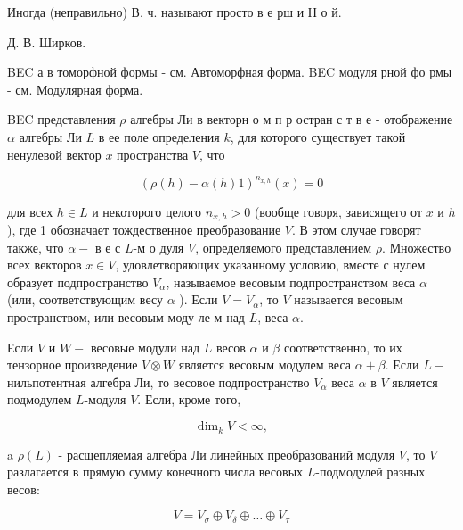 \documentclass[10pt]{article}
\begin{document}
Иногда (неправильно) В. ч. называют просто в е рш и Н о й.



Д. В. Ширков.



BEC а в томорфной формы - см. Автоморфная форма. BEC модуля рной фо рмы - см. Модулярная форма.



BEC представления $\rho$ алгебры Ли в векторн о м п р остран с т в е - отображение $\alpha$ алгебры Ли $L$ в ее поле определения $k$, для которого существует такой ненулевой вектор $x$ пространства $V$, что



\[

(\rho(h)-\alpha(h) 1)^{n_{x, h}}(x)=0

\]



для всех $h \in L$ и некоторого целого $n_{x, h}>0$ (вообще говоря, зависящего от $x$ и $h$ ), где 1 обозначает тождественное преобразование $V$. В этом случае говорят также, что $\alpha-$ в е с $L$-м о дуля $V$, определяемого представлением $\rho$. Множество всех векторов $x \in V$, удовлетворяющих указанному условию, вместе с нулем образует подпространство $V_{\alpha}$, называемое весовым подпространством веса $\alpha$ (или, соответствующим весу $\alpha$ ). Если $V=V_{\alpha}$, то $V$ называется весовым пространством, или весовым моду ле м над $L$, веса $\alpha$.



Если $V$ и $W-$ весовые модули над $L$ весов $\alpha$ и $\beta$ соответственно, то их тензорное произведение $V \otimes W$ является весовым модулем веса $\alpha+\beta$. Если $L-$ нильпотентная алгебра Ли, то весовое подпространство $V_{\alpha}$ веса $\alpha$ в $V$ является подмодулем $L$-модуля $V$. Если, кроме того,



\[

\operatorname{dim}_{k} V<\infty,

\]



a $\rho(L)$ - расщепляемая алгебра Ли линейных преобразований модуля $V$, то $V$ разлагается в прямую сумму конечного числа весовых $L$-подмодулей разных весов:



\[

V=V_{\sigma} \oplus V_{\delta} \oplus \ldots \oplus V_{\tau}

\]
\end{document}
